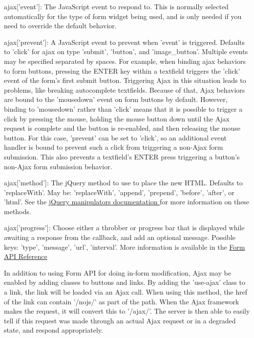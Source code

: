 \begin{DoxyItemize}
\item ajax\mbox{[}'event'\mbox{]}: The JavaScript event to respond to. This is normally selected automatically for the type of form widget being used, and is only needed if you need to override the default behavior.
\item ajax\mbox{[}'prevent'\mbox{]}: A JavaScript event to prevent when 'event' is triggered. Defaults to 'click' for ajax on type 'submit', 'button', and 'image\_\-button'. Multiple events may be specified separated by spaces. For example, when binding ajax behaviors to form buttons, pressing the ENTER key within a textfield triggers the 'click' event of the form's first submit button. Triggering Ajax in this situation leads to problems, like breaking autocomplete textfields. Because of that, Ajax behaviors are bound to the 'mousedown' event on form buttons by default. However, binding to 'mousedown' rather than 'click' means that it is possible to trigger a click by pressing the mouse, holding the mouse button down until the Ajax request is complete and the button is re-\/enabled, and then releasing the mouse button. For this case, 'prevent' can be set to 'click', so an additional event handler is bound to prevent such a click from triggering a non-\/Ajax form submission. This also prevents a textfield's ENTER press triggering a button's non-\/Ajax form submission behavior.
\item ajax\mbox{[}'method'\mbox{]}: The jQuery method to use to place the new HTML. Defaults to 'replaceWith'. May be: 'replaceWith', 'append', 'prepend', 'before', 'after', or 'html'. See the \hyperlink{}{jQuery manipulators documentation } for more information on these methods.
\item ajax\mbox{[}'progress'\mbox{]}: Choose either a throbber or progress bar that is displayed while awaiting a response from the callback, and add an optional message. Possible keys: 'type', 'message', 'url', 'interval'. More information is available in the \hyperlink{}{Form API Reference }
\end{DoxyItemize}

In addition to using Form API for doing in-\/form modification, Ajax may be enabled by adding classes to buttons and links. By adding the 'use-\/ajax' class to a link, the link will be loaded via an Ajax call. When using this method, the href of the link can contain '/nojs/' as part of the path. When the Ajax framework makes the request, it will convert this to '/ajax/'. The server is then able to easily tell if this request was made through an actual Ajax request or in a degraded state, and respond appropriately.

